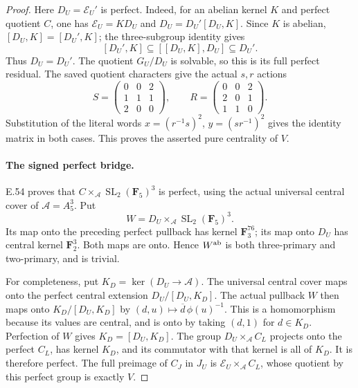 \begin{proof}
Here $D_U=\mathcal E_U'$ is perfect. Indeed, for an
abelian kernel $K$ and perfect quotient $C$, one has
$\mathcal E_U=KD_U$ and $D_U=D_U'[D_U,K]$.
Since $K$ is abelian,
$[D_U,K]=[D_U',K]$; the three-subgroup identity gives
\[
 [D_U',K]\subseteq[[D_U,K],D_U]\subseteq D_U'.
 \tag{E.60.13}
\]
Thus $D_U=D_U'$. The quotient $G_U/D_U$ is solvable,
so this is its full perfect residual. The saved quotient
characters give the actual $s,r$ actions
\[
 S=\begin{pmatrix}0&0&2\\1&1&1\\2&0&0\end{pmatrix},
 \qquad
 R=\begin{pmatrix}0&0&2\\2&0&1\\1&1&0\end{pmatrix}.
 \tag{E.60.14}
\]
Substitution of the literal words
$x=(r^{-1}s)^2$, $y=(sr^{-1})^2$ gives the identity
matrix in both cases. This proves the asserted pure
centrality of $V$.

\paragraph{The signed perfect bridge.}
E.54 proves that
$C\times_{\mathcal A}\operatorname{SL}_2(\mathbf F_5)^3$
is perfect, using the actual universal central cover
of $\mathcal A=A_5^3$. Put
\[
 W=D_U\times_{\mathcal A}\operatorname{SL}_2(\mathbf F_5)^3.
 \tag{E.60.15}
\]
Its map onto the preceding perfect pullback has kernel
$\mathbf F_3^{76}$; its map onto $D_U$ has central
kernel $\mathbf F_2^3$. Both maps are onto.
Hence $W^{\rm ab}$ is both three-primary and two-primary,
and is trivial.

For completeness, put $K_D=\ker(D_U\to\mathcal A)$.
The universal central cover maps onto the perfect
central extension $D_U/[D_U,K_D]$.
The actual pullback $W$ then maps onto
$K_D/[D_U,K_D]$ by
$(d,u)\mapsto\overline d\,\phi(u)^{-1}$.
This is a homomorphism because its values are central,
and is onto by taking $(d,1)$ for $d\in K_D$.
Perfection of $W$ gives $K_D=[D_U,K_D]$.
The group $D_U\times_{\mathcal A}C_L$ projects onto
the perfect $C_L$, has kernel $K_D$, and its commutator
with that kernel is all of $K_D$. It is therefore perfect.
The full preimage of $C_J$ in $J_U$ is
$\mathcal E_U\times_{\mathcal A}C_L$, whose quotient
by this perfect group is exactly $V$.


\end{proof}
